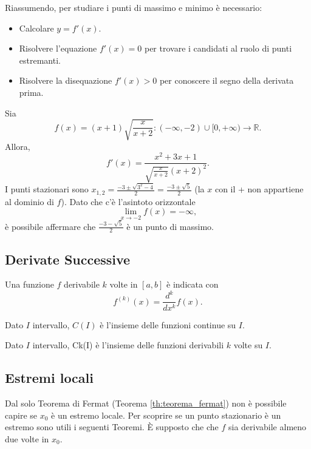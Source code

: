 Riassumendo, per studiare i punti di massimo e minimo è necessario:
\begin{itemize}
    \item Calcolare $y = f'(x)$.
    \item Risolvere l'equazione $f'(x) = 0$ per trovare i candidati al ruolo di punti estremanti.
    \item Risolvere la disequazione $f'(x) > 0$ per conoscere il segno della derivata prima.
\end{itemize}

\begin{example}
    Sia
    \begin{equation*}
        f(x)=(x+1)\sqrt{\frac{x}{x+2}}\colon(-\infty,-2)\cup[0,+\infty)\rightarrow\mathbb R.
    \end{equation*}
    Allora,
    \begin{equation*}
        f'(x)=\frac{x^2+3x+1}{\sqrt{\frac{x}{x+2}}(x+2)^2}.
    \end{equation*}
    I punti stazionari sono $x_{1,2}=\frac{-3\pm\sqrt{3^2-4}}{2}=\frac{-3\pm\sqrt{5}}{2}$ (la $x$ con il + non appartiene al dominio di $f$). Dato che c'è l'asintoto orizzontale
    \begin{equation*}
        \lim_{x\rightarrow -2}f(x)=-\infty,
    \end{equation*}
    è possibile affermare che $\frac{-3-\sqrt{5}}{2}$ è un punto di massimo.
\end{example}


\subsection{Derivate Successive}
Una funzione $f$ derivabile $k$ volte in $[a,b]$ è indicata con
\begin{equation*}
    f^{(k)}(x)=\frac{d^k}{dx^k}f(x).
\end{equation*}

\begin{definition}
    Dato $I$ intervallo, $C(I)$ è l'insieme delle funzioni continue su $I$.
\end{definition}

\begin{definition}
    Dato $I$ intervallo, \gls{Ck(I)} è l'insieme delle funzioni derivabili $k$ volte su $I$.
\end{definition}

\subsection{Estremi locali}\label{ssec:estremi_locali_derivate}
Dal solo Teorema di Fermat (Teorema \ref{th:teorema_fermat}) non è possibile capire se $x_0$ è un estremo locale. Per scoprire se un \gls{punto stazionario} è un estremo sono utili i seguenti Teoremi. È supposto che che $f$ sia derivabile almeno due volte in $x_0$.

